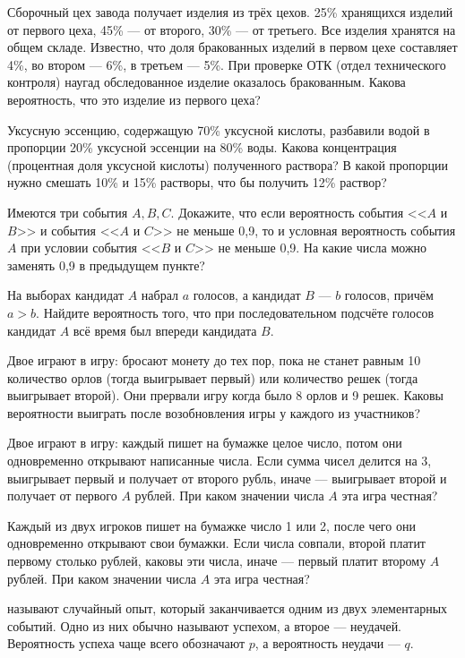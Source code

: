 \documentclass[a4paper,12pt]{article}
\begin{document}
  Сборочный цех завода получает изделия из трёх цехов. 25\% хранящихся изделий от первого цеха, 45\% --- от второго, 30\% --- от третьего. Все изделия хранятся на общем складе. Известно, что доля бракованных изделий в первом цехе составляет 4\%, во втором --- 6\%, в третьем --- 5\%. При проверке ОТК (отдел технического контроля) наугад обследованное изделие оказалось бракованным. Какова вероятность, что это изделие из первого цеха?

   Уксусную эссенцию, содержащую 70\% уксусной кислоты, разбавили водой в пропорции 20\% уксусной эссенции на 80\% воды. Какова концентрация (процентная доля уксусной кислоты) полученного раствора?
   В какой пропорции нужно смешать 10\% и 15\% растворы, что бы получить 12\% раствор?

   Имеются три события $A,B,C$. Докажите, что если вероятность события <<$A$ и $B$>> и события <<$A$ и $C$>> не меньше 0,9, то и условная вероятность события $A$ при условии события <<$B$ и $C$>> не меньше 0,9.
   На какие числа можно заменять 0,9 в предыдущем пункте?

  На выборах кандидат $A$ набрал $a$ голосов, а кандидат $B$ --- $b$ голосов, причём $a>b$. Найдите вероятность того, что при последовательном подсчёте голосов кандидат $A$ всё время был впереди кандидата $B$.

  Двое играют в игру: бросают монету до тех пор, пока не станет равным 10 количество орлов (тогда выигрывает первый) или количество решек (тогда выигрывает второй). Они прервали игру когда было 8 орлов и 9 решек. Каковы вероятности выиграть после возобновления игры у каждого из участников?


  Двое играют в игру: каждый пишет на бумажке целое число, потом они одновременно открывают написанные числа. Если сумма чисел делится на 3, выигрывает первый и получает от второго рубль, иначе --- выигрывает второй и получает от первого $A$ рублей. При каком значении числа $A$ эта игра честная?

  Каждый из двух игроков пишет на бумажке число 1 или 2, после чего они одновременно открывают свои бумажки. Если числа совпали, второй платит первому столько рублей, каковы эти числа, иначе --- первый платит второму $A$ рублей. При каком значении числа $A$ эта игра честная?

   называют случайный опыт, который заканчивается одним из двух элементарных событий. Одно из них обычно называют  успехом, а второе ---  неудачей. Вероятность успеха чаще всего обозначают $p$, а вероятность неудачи --- $q$.
\end{document}
